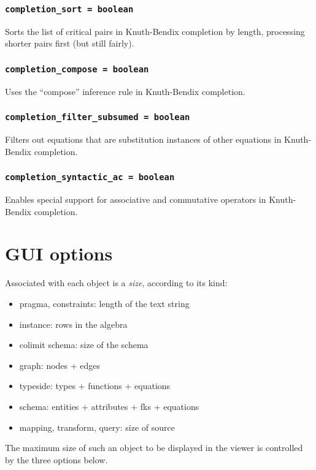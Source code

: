 \documentclass[10pt]{book}
\begin{document}
\subsubsection{{\tt completion\_sort = boolean}}

Sorts the list of critical pairs in Knuth-Bendix completion by length, processing shorter pairs first (but still fairly).

\subsubsection{{\tt completion\_compose = boolean}}

Uses the ``compose'' inference rule in Knuth-Bendix completion.

\subsubsection{{\tt completion\_filter\_subsumed = boolean}}

Filters out equations that are substitution instances of other equations in Knuth-Bendix completion.

\subsubsection{{\tt completion\_syntactic\_ac = boolean}}

Enables special support for associative and commutative operators in Knuth-Bendix completion.

\section{GUI options}

Associated with each object is a {\it size}, according to its kind:
\begin{itemize}
\item pragma, constraints: length of the text string
\item instance: rows in the algebra
\item colimit schema: size of the schema
\item graph: nodes + edges
\item typeside: types + functions + equations
\item schema: entities + attributes + fks + equations
\item mapping, transform, query: size of source
\end{itemize}

The maximum size of such an object to be displayed in the viewer is controlled by the three options below.
\end{document}
